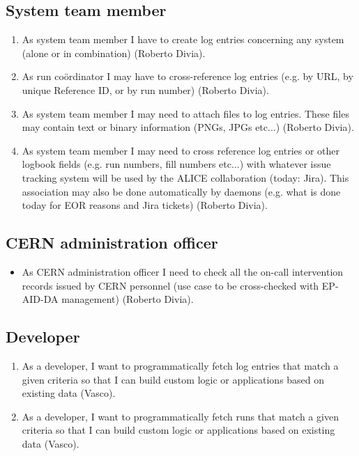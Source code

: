 \subsection{System team member}
\begin{enumerate}
  \item As system team member I have to create log entries concerning any system (alone or in combination) (Roberto Divia).
  \item As run co\"ordinator I may have to cross-reference log entries (e.g. by URL, by unique Reference ID, or by run number)  (Roberto Divia).
  \item  As system team member I may need to attach files to log entries. These files may contain text or binary information (PNGs, JPGs etc...) (Roberto Divia).
  \item As system team member I may need to cross reference log entries or other logbook fields (e.g. run numbers, fill numbers etc...) with whatever issue tracking system will be used by the ALICE collaboration (today: Jira). This association may also be done automatically by daemons (e.g. what is done today for EOR reasons and Jira tickets) (Roberto Divia).
\end{enumerate}

\subsection{CERN administration officer}
\begin{itemize}
  \item As CERN administration officer I need to check all the on-call intervention records issued by CERN personnel (use case to be cross-checked with EP-AID-DA management) (Roberto Divia).
\end{itemize}

\subsection{Developer}
\begin{enumerate}
  \item As a developer, I want to programmatically fetch log entries that match a given criteria so that I can build custom logic or applications based on existing data (Vasco). 
  \item As a developer, I want to programmatically fetch runs that match a given criteria so that I can build custom logic or applications based on existing data (Vasco). 
\end{enumerate}

